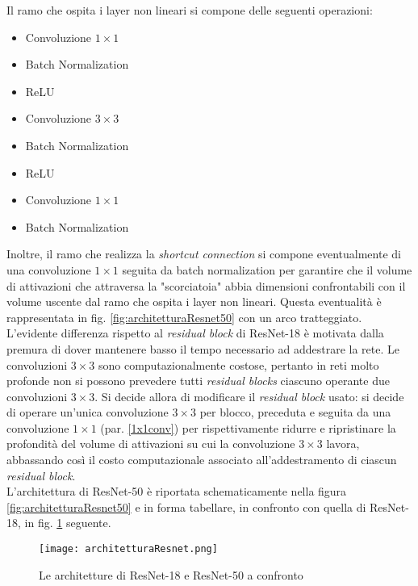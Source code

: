 Il ramo che ospita i layer non lineari si compone delle seguenti operazioni:

\begin{itemize}
\item Convoluzione $1\times 1$
\item Batch Normalization
\item ReLU
\item Convoluzione $3\times 3$
\item Batch Normalization
\item ReLU
\item Convoluzione $1\times 1$
\item Batch Normalization
\end{itemize}

Inoltre, il ramo che realizza la \textit{shortcut connection} si compone eventualmente di una convoluzione $1\times 1$ seguita da batch normalization per garantire che il volume di attivazioni che attraversa la "scorciatoia" abbia dimensioni confrontabili con il volume uscente dal ramo che ospita i layer non lineari. Questa eventualità è rappresentata in fig. \ref{fig:architetturaResnet50} con un arco tratteggiato.\\

L'evidente differenza rispetto al \textit{residual block} di ResNet-18 è motivata dalla premura di dover mantenere basso il tempo necessario ad addestrare la rete. Le convoluzioni $3\times 3$ sono computazionalmente costose, pertanto in reti molto profonde non si possono prevedere tutti \textit{residual blocks} ciascuno operante due convoluzioni $3\times 3$. Si decide allora di modificare il \textit{residual block} usato: si decide di operare un'unica convoluzione $3\times 3$ per blocco, preceduta e seguita da una convoluzione $1\times 1$ (par. \ref{1x1conv}) per rispettivamente ridurre e ripristinare la profondità del volume di attivazioni su cui la convoluzione $3\times 3$ lavora, abbassando così il costo computazionale associato all'addestramento di ciascun \textit{residual block}.\\

L'architettura di ResNet-50 è riportata schematicamente nella figura \ref{fig:architetturaResnet50} e in forma tabellare, in confronto con quella di ResNet-18, in fig. \ref{fig:confrontoResnet} seguente.

\begin{figure}[h!]
\centering
\texttt{[image: architetturaResnet.png]}
\caption{Le architetture di ResNet-18 e ResNet-50 a confronto}
\label{fig:confrontoResnet}
\end{figure}

